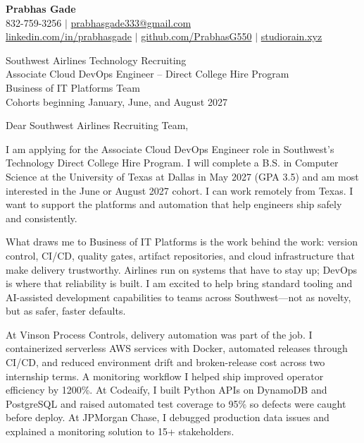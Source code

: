 \documentclass[letterpaper,11pt]{letter}
\begin{document}
\begin{flushleft}
\textbf{\large Prabhas Gade}\\
832-759-3256 $|$ \href{mailto:prabhasgade333@gmail.com}{prabhasgade333@gmail.com}\\
\href{https://linkedin.com/in/prabhasgade}{linkedin.com/in/prabhasgade} $|$
\href{https://github.com/PrabhasG550}{github.com/PrabhasG550} $|$
\href{https://studiorain.xyz}{studiorain.xyz}
\end{flushleft}

\vspace{6pt}
\begin{flushleft}
Southwest Airlines Technology Recruiting\\
Associate Cloud DevOps Engineer -- Direct College Hire Program\\
Business of IT Platforms Team\\
Cohorts beginning January, June, and August 2027
\end{flushleft}

Dear Southwest Airlines Recruiting Team,

I am applying for the Associate Cloud DevOps Engineer role in Southwest's Technology Direct College Hire Program. I will complete a B.S. in Computer Science at the University of Texas at Dallas in May 2027 (GPA 3.5) and am most interested in the June or August 2027 cohort. I can work remotely from Texas. I want to support the platforms and automation that help engineers ship safely and consistently.

What draws me to Business of IT Platforms is the work behind the work: version control, CI/CD, quality gates, artifact repositories, and cloud infrastructure that make delivery trustworthy. Airlines run on systems that have to stay up; DevOps is where that reliability is built. I am excited to help bring standard tooling and AI-assisted development capabilities to teams across Southwest---not as novelty, but as safer, faster defaults.

At Vinson Process Controls, delivery automation was part of the job. I containerized serverless AWS services with Docker, automated releases through CI/CD, and reduced environment drift and broken-release cost across two internship terms. A monitoring workflow I helped ship improved operator efficiency by 1200\%. At Codeaify, I built Python APIs on DynamoDB and PostgreSQL and raised automated test coverage to 95\% so defects were caught before deploy. At JPMorgan Chase, I debugged production data issues and explained a monitoring solution to 15+ stakeholders.
\end{document}
